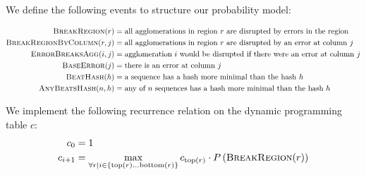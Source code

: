 \documentclass[11pt]{ucscthesis}
\newcommand{\rtop}[1]{\mathrm{top}(#1)}
\newcommand{\rbottom}[1]{\mathrm{bottom}(#1)}
\begin{document}
\newcommand{\BreakRegion}[1]{\textsc{BreakRegion}(#1)}
\newcommand{\BreakRegionByColumn}[2]{\textsc{BreakRegionByColumn}(#1, #2)}
\newcommand{\ErrorBreaksAgg}[2]{\textsc{ErrorBreaksAgg}(#1, #2)}
\newcommand{\BaseError}[1]{\textsc{BaseError}(#1)}
\newcommand{\BeatHash}[1]{\textsc{BeatHash}(#1)}
\newcommand{\AnyBeatsHash}[2]{\textsc{AnyBeatsHash}(#1, #2)}

We define the following events to structure our probability model:

\begin{align*}
    \BreakRegion{r} &= \text{all agglomerations in region } r \text{ are disrupted by errors in the region} \nonumber \\
    \BreakRegionByColumn{r}{j} &= \text{all agglomerations in region } r \text{ are disrupted by an error at column } j \nonumber\\
    \ErrorBreaksAgg{i}{j} &= \text{agglomeration } i \text{ would be disrupted if there were an error at column } j \nonumber \\
    \BaseError{j} &= \text{there is an error at column } j \nonumber \\
    \BeatHash{h} &= \text{a sequence has a hash more minimal than the hash } h \nonumber \\
    \AnyBeatsHash{n}{h} &= \text{any of } n \text{ sequences has a hash more minimal than the hash } h \nonumber
\end{align*}

\begin{samepage}
We implement the following recurrence relation on the dynamic programming table $c$:
\nopagebreak
\begin{align*}
    c_0 &= 1 \nonumber \\
    c_{i + 1} &= \max_{\forall r \mid i \in \left\{\rtop{r} \ldots \rbottom{r}\right\}} c_{\rtop{r}} \cdot \Prob{\BreakRegion{r}} \nonumber
\end{align*}
\end{samepage}

\newcommand{\candidates}[2]{\mathrm{candidates}({#1},\ {#2})}
\end{document}

